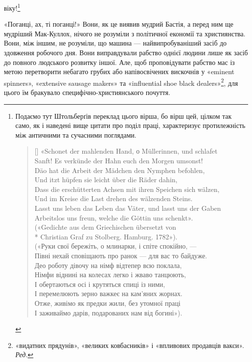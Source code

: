 віку!\footnote{
Подаємо тут Штольберґів переклад цього вірша, бо вірш цей,
цілком так само, як і наведені вище цитати про поділ праці, характеризує
протилежність між античними та сучасними поглядами.

\settowidth{\versewidth}{Lasst uns leben das Leben das Väter, und lasst uns der Gaben}
\begin{verse}[\versewidth]
«Schonet der mahlenden Hand, о Müllerinnen, und schlafet\\
Sanft! Es verkünde der Hahn euch den Morgen umsonst!\\
Däo hat die Arbeit der Mädchen den Nymphen befohlen,\\
Und itzt hüpfen sie leicht über die Räder dahin,\\
Dass die erschütterten Achsen mit ihren Speichen sich wälzen,\\
Und im Kreise die Last drehen des wälzenden Steins.\\
Lasst uns leben das Leben das Väter, und lasst uns der Gaben\\
Arbeitslos uns freun, welche die Göttin uns schenkt».\\
\smallskip
(«Gedichte aus dem Griechischen übersetzt von\\*
Christian Graf zu Stolberg. Hamburg. 1782»).\\
\smallskip
(«Руки свої бережіть, о млинарки, і спіте спокійно, —\\
Півні нехай сповіщають про ранок — для вас то байдуже.\\
Део роботу дівочу на німф відтепер всю поклала,\\
Німфи віднині на колесах легко і жваво танцюють,\\
І обертаються осі і крутяться спиці із ними,\\
І перемелюють зерно важкеє на кам'яних жорнах.\\
Отже, живімо як предки жили, без утомної праці\\
І заживаймо дарів, подарованих нам від богині»).\\
\end{verse}

}

«Поганці, ах, ті поганці!» Вони, як це виявив мудрий Бастія,
а перед ним ще мудріший Мак-Куллох, нічого не розуміли з
політичної економії та християнства. Вони, між іншим, не розуміли,
що машина — найвипробуваніший засіб до здовження робочого
дня. Вони виправдували рабство однієї людини лише як
засіб до повного людського розвитку іншої. Але, щоб проповідувати
рабство мас із метою перетворити небагато грубих або
напівосвічених вискочнів у «eminent spinners», «extensive sausage
makers» та «influential shoe black dealers»\footnote*{
«видатних прядунів», «великих ковбасників» і «впливових
продавців вакси». \emph{Ред.}
}, для цього їм
бракувало специфічно-християнського почуття.

